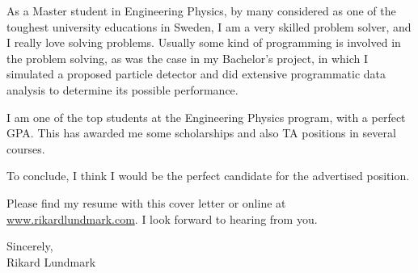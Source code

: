 As a Master student in Engineering Physics, by many considered as one of the toughest university educations in Sweden, I am a very skilled problem solver, and I really love solving problems. Usually some kind of programming is involved in the problem solving, as was the case in my Bachelor's project, in which I simulated a proposed particle detector and did extensive programmatic data analysis to determine its possible performance. 


I am one of the top students at the Engineering Physics program, with a perfect GPA. This has awarded me some scholarships and also TA positions in several courses. 


To conclude, I think I would be the perfect candidate for the advertised position.

Please find my resume with this cover letter or online at \url{www.rikardlundmark.com}. I look forward to hearing from you.



Sincerely, \\
Rikard Lundmark

